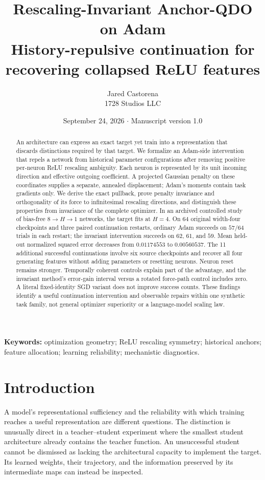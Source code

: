 \documentclass[11pt,letterpaper]{article}
\title{\textbf{Rescaling-Invariant Anchor-QDO on Adam}\\[5pt]
\large History-repulsive continuation for recovering collapsed ReLU features}
\author{Jared Castorena\\1728 Studios LLC}
\date{September 24, 2026 \quad $\cdot$ \quad Manuscript version 1.0}
\theoremstyle{remark}\newtheorem{remark}{Remark}
\begin{document}
\maketitle
\begin{abstract}
An architecture can express an exact target yet train into a representation that discards distinctions required by that target. We formalize an Adam-side intervention that repels a network from historical parameter configurations after removing positive per-neuron ReLU rescaling ambiguity. Each neuron is represented by its unit incoming direction and effective outgoing coefficient. A projected Gaussian penalty on these coordinates supplies a separate, annealed displacement; Adam's moments contain task gradients only. We derive the exact pullback, prove penalty invariance and orthogonality of its force to infinitesimal rescaling directions, and distinguish these properties from invariance of the complete optimizer. In an archived controlled study of bias-free $8\!\to\!H\!\to\!1$ networks, the target fits at $H=4$. On 64 original width-four checkpoints and three paired continuation restarts, ordinary Adam succeeds on $57/64$ trials in each restart; the invariant intervention succeeds on $62$, $61$, and $59$. Mean held-out normalized squared error decreases from $0.01174553$ to $0.00560537$. The 11 additional successful continuations involve six source checkpoints and recover all four generating features without adding parameters or resetting neurons. Neuron reset remains stronger. Temporally coherent controls explain part of the advantage, and the invariant method's error-gain interval versus a rotated force-path control includes zero. A literal fixed-identity SGD variant does not improve success counts. These findings identify a useful continuation intervention and observable repairs within one synthetic task family, not general optimizer superiority or a language-model scaling law.
\end{abstract}
\noindent\textbf{Keywords:} optimization geometry; ReLU rescaling symmetry; historical anchors; feature allocation; learning reliability; mechanistic diagnostics.

\section{Introduction}
A model's representational sufficiency and the reliability with which training reaches a useful representation are different questions. The distinction is unusually direct in a teacher--student experiment where the smallest student architecture already contains the teacher function. An unsuccessful student cannot be dismissed as lacking the architectural capacity to implement the target. Its learned weights, their trajectory, and the information preserved by its intermediate maps can instead be inspected.
\end{document}
